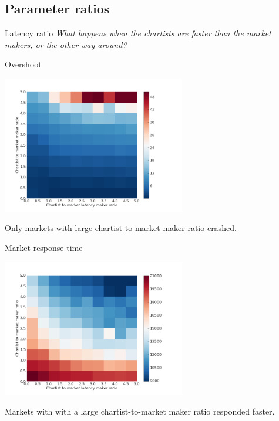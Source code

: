 \documentclass[14pt]{beamer}
\begin{document}
\subsection{Parameter ratios}
\begin{frame}
\tableofcontents[currentsubsection]
\end{frame}

\begin{frame}{Latency ratio}
\textit{What happens when the chartists are faster than the market makers, or the other way around?}
\end{frame}

\begin{frame}{Overshoot}
\begin{center}
\includegraphics[width=0.6\textwidth]{ratio/overshoot.png}
\end{center}
Only markets with large chartist-to-market maker ratio crashed.
\end{frame}




\begin{frame}{Market response time}
\begin{center}
\includegraphics[width=0.6\textwidth]{ratio/time_to_reach_new_fundamental.png}
\end{center}
Markets with with a large chartist-to-market maker ratio responded faster.
\end{frame}
\end{document}
